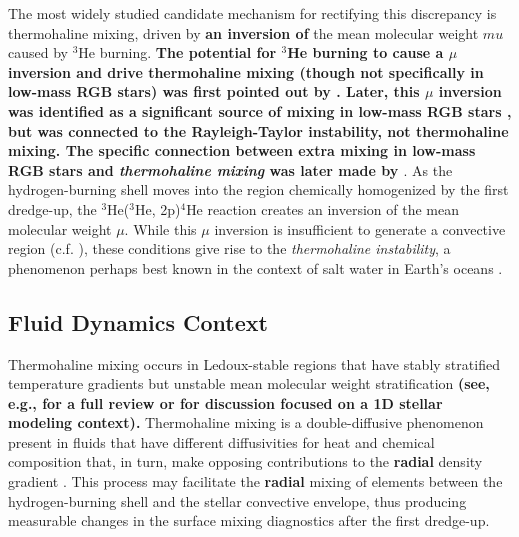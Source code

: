 The most widely studied candidate mechanism for rectifying this discrepancy is thermohaline mixing, driven by \textbf{an inversion of} the mean molecular weight $mu$ caused by $^3$He burning. 
\textbf{The potential for $^3$He burning to cause a $\mu$ inversion and drive thermohaline mixing (though not specifically in low-mass RGB stars) was first pointed out by \citet{Ulrich1972}. Later, this $\mu$ inversion was identified as a significant source of mixing in low-mass RGB stars \citep{Dearborn2006, Eggleton2006, Eggleton2007}, but was connected to the Rayleigh-Taylor instability, not thermohaline mixing. The specific connection between extra mixing in low-mass RGB stars and \textit{thermohaline mixing} was later made by \citet{charbonnel_thermohaline_2007}}. As the hydrogen-burning shell moves into the region chemically homogenized by the  first dredge-up, the $^3$He($^3$He, 2p)$^4$He reaction creates an inversion of the mean molecular weight $\mu$. While this $\mu$ inversion is insufficient to generate a convective region (c.f. \citealt{CantielloLanger2010}), these conditions give rise to the 
\textit{thermohaline instability}, a phenomenon perhaps best known in the context of salt water in Earth's oceans \citep{Stern1960,baines_gill_1969}. 

\subsection{Fluid Dynamics Context} \label{intro:subsec:fluids}
Thermohaline mixing occurs in Ledoux-stable regions that have stably stratified temperature gradients but unstable mean molecular weight stratification 
\textbf{(see, e.g., \citealt{garaud_DDC_review_2018} for a full review or \citealt{SalarisCassisi2017} for discussion focused on a 1D stellar modeling context).}
Thermohaline mixing is a double-diffusive phenomenon present in fluids that have different diffusivities for heat and chemical composition that, in turn, make opposing contributions to the \textbf{radial} density gradient \citep{Turner:1974}.
This process may facilitate the \textbf{radial} mixing of elements between the hydrogen-burning shell and the stellar convective envelope, thus producing measurable changes in the surface mixing diagnostics after the first dredge-up. 

